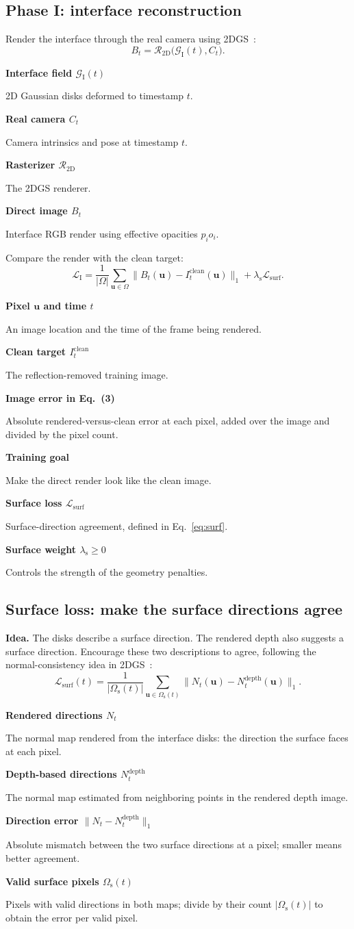 \documentclass[10pt,a4paper]{article}
\newcommand{\notation}[2]{\noindent\textbf{#1}\par\nopagebreak #2\par}
\newcommand{\GI}{\mathcal G_{\mathrm I}}
\newcommand{\RI}{\mathcal R_{\mathrm{2D}}}
\newcommand{\uu}{\mathbf u}
\newcommand{\Om}{\Omega}
\newcommand{\notepair}[4]{\par\noindent
\begin{minipage}[t]{0.485\textwidth}\small\notation{#1}{#2}\end{minipage}\hfill
\begin{minipage}[t]{0.485\textwidth}\small\notation{#3}{#4}\end{minipage}\par\vspace{1pt}}
\begin{document}
\subsection*{Phase I: interface reconstruction}
Render the interface through the real camera using 2DGS~\cite{huang2024}:
\begin{equation}
B_t=\RI\bigl(\GI(t),C_t\bigr). \tag{2}
\end{equation}
\notepair{Interface field $\GI(t)$}{2D Gaussian disks deformed to timestamp $t$.}
{Real camera $C_t$}{Camera intrinsics and pose at timestamp $t$.}
\notepair{Rasterizer $\RI$}{The 2DGS renderer.}
{Direct image $B_t$}{Interface RGB render using effective opacities $p_i o_i$.}
Compare the render with the clean target:
\begin{equation}
\mathcal L_{\mathrm I}=\frac{1}{|\Om|}\sum_{\uu\in\Om}
\bigl\|B_t(\uu)-I_t^{\mathrm{clean}}(\uu)\bigr\|_1
+\lambda_{\mathrm s}\mathcal L_{\mathrm{surf}}. \tag{3}
\end{equation}
\notepair{Pixel $\uu$ and time $t$}{An image location and the time of the frame being rendered.}
{Clean target $I_t^{\mathrm{clean}}$}{The reflection-removed training image.}
\notepair{Image error in Eq.~(3)}{Absolute rendered-versus-clean error at each pixel, added over the image and divided by the pixel count.}
{Training goal}{Make the direct render look like the clean image.}
\notepair{Surface loss $\mathcal L_{\mathrm{surf}}$}{Surface-direction agreement, defined in Eq.~\eqref{eq:surf}.}
{Surface weight $\lambda_{\mathrm s}\geq0$}{Controls the strength of the geometry penalties.}
\subsection*{Surface loss: make the surface directions agree}
\textbf{Idea.} The disks describe a surface direction. The rendered depth also suggests a surface direction. Encourage these two descriptions to agree, following the normal-consistency idea in 2DGS~\cite{huang2024}:
\begin{equation}
\boxed{\mathcal L_{\mathrm{surf}}(t)=\frac{1}{|\Om_{\mathrm s}(t)|}
\sum_{\uu\in\Om_{\mathrm s}(t)}
\bigl\|N_t(\uu)-N_t^{\mathrm{depth}}(\uu)\bigr\|_1.}
\tag{3a}\label{eq:surf}
\end{equation}
\notepair{Rendered directions $N_t$}{The normal map rendered from the interface disks: the direction the surface faces at each pixel.}
{Depth-based directions $N_t^{\mathrm{depth}}$}{The normal map estimated from neighboring points in the rendered depth image.}
\notepair{Direction error $\|N_t-N_t^{\mathrm{depth}}\|_1$}{Absolute mismatch between the two surface directions at a pixel; smaller means better agreement.}
{Valid surface pixels $\Om_{\mathrm s}(t)$}{Pixels with valid directions in both maps; divide by their count $|\Om_{\mathrm s}(t)|$ to obtain the error per valid pixel.}
\end{document}
